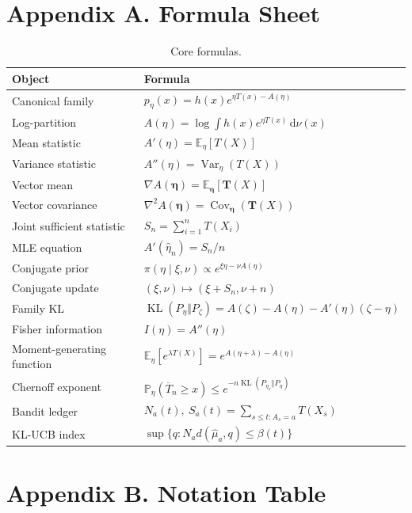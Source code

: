 \documentclass[en,nofont,11pt]{elegantbook}
\newcommand{\E}{\mathbb{E}}
\newcommand{\Pbb}{\mathbb{P}}
\newcommand{\KL}{\operatorname{KL}}
\newcommand{\Var}{\operatorname{Var}}
\newcommand{\Cov}{\operatorname{Cov}}
\newcommand{\dd}{\mathrm{d}}
\begin{document}
\backmatter
\chapter*{Appendix A. Formula Sheet}

\begin{table}[H]
\centering
\caption*{Core formulas.}
\begin{tabular}{p{}p{}}
\toprule
Object & Formula \\
\midrule
Canonical family & $p_\eta(x)=h(x)e^{\eta T(x)-A(\eta)}$ \\
Log-partition & $A(\eta)=\log\int h(x)e^{\eta T(x)}\,\dd\nu(x)$ \\
Mean statistic & $A'(\eta)=\E_\eta[T(X)]$ \\
Variance statistic & $A''(\eta)=\Var_\eta(T(X))$ \\
Vector mean & $\nabla A(\bm\eta)=\E_{\bm\eta}[\bm T(X)]$ \\
Vector covariance & $\nabla^2A(\bm\eta)=\Cov_{\bm\eta}(\bm T(X))$ \\
Joint sufficient statistic & $S_n=\sum_{i=1}^{n}T(X_i)$ \\
MLE equation & $A'(\widehat\eta_n)=S_n/n$ \\
Conjugate prior & $\pi(\eta\mid\xi,\nu)\propto e^{\xi\eta-\nu A(\eta)}$ \\
Conjugate update & $(\xi,\nu)\mapsto(\xi+S_n,\nu+n)$ \\
Family KL & $\KL(P_\eta\Vert P_\zeta)=A(\zeta)-A(\eta)-A'(\eta)(\zeta-\eta)$ \\
Fisher information & $I(\eta)=A''(\eta)$ \\
Moment-generating function & $\E_\eta[e^{\lambda T(X)}]=e^{A(\eta+\lambda)-A(\eta)}$ \\
Chernoff exponent & $\Pbb_\eta(\overline T_n\ge x)\le e^{-n\KL(P_{\eta_x}\Vert P_\eta)}$ \\
Bandit ledger & $N_a(t),\ S_a(t)=\sum_{s\le t:A_s=a}T(X_s)$ \\
KL-UCB index & $\sup\{q:N_a d(\widehat\mu_a,q)\le\beta(t)\}$ \\
\bottomrule
\end{tabular}
\end{table}

\chapter*{Appendix B. Notation Table}
\end{document}
